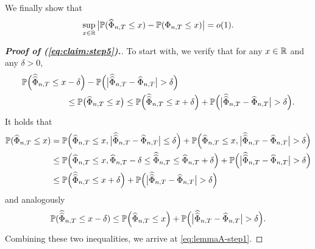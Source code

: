 We finally show that 
\begin{equation}\label{eq:claim:step5}
\sup_{x \in \mathbb{R}} \big| \mathbb{P}(\widehat{\Phi}_{n, T} \le x) - \mathbb{P}(\Phi_{n,T} \le x) \big| = o(1).
\end{equation}
\begin{proof}[\textnormal{\textbf{Proof of (\ref{eq:claim:step5}).}}]
To start with, we verify that for any $x \in \mathbb{R}$ and any $\delta > 0$, 
\begin{align}
\mathbb{P}\Big( \widehat{\widehat{\Phi}}_{n,T} \le x & - \delta\Big) - \mathbb{P} \Big(\big|\widehat{\widehat{\Phi}}_{n,T} - \widehat{\Phi}_{n,T}\big| > \delta \Big) \nonumber \\
 & \le \mathbb{P}\big(\widehat{\Phi}_{n, T} \le x\big) \le\mathbb{P}\Big(\widehat{\widehat{\Phi}}_{n,T} \le x + \delta\Big) + \mathbb{P} \Big(\big|\widehat{\widehat{\Phi}}_{n,T} - \widehat{\Phi}_{n,T}\big| > \delta \Big). \label{eq:lemmaA-step1}
\end{align}
It holds that
\begin{align*} 
\mathbb{P}(\widehat{\Phi}_{n, T} \le x) &= \mathbb{P} \Big(\widehat{\Phi}_{n, T} \le x, \big|\widehat{\widehat{\Phi}}_{n,T} - \widehat{\Phi}_{n,T}\big| \le \delta \Big) + \mathbb{P} \Big(\widehat{\Phi}_{n, T} \le x, \big|\widehat{\widehat{\Phi}}_{n,T} - \widehat{\Phi}_{n,T}\big| > \delta \Big) \\
& \le  \mathbb{P} \Big(\widehat{\Phi}_{n, T} \le x, \widehat{\Phi}_{n,T} - \delta \le \widehat{\widehat{\Phi}}_{n,T} \le \widehat{\Phi}_{n,T} + \delta \Big) + \mathbb{P} \Big(\big|\widehat{\widehat{\Phi}}_{n,T} - \widehat{\Phi}_{n,T}\big| > \delta \Big) \\
& \le  \mathbb{P} \Big(\widehat{\widehat{\Phi}}_{n,T} \le x + \delta \Big) + \mathbb{P} \Big(\big|\widehat{\widehat{\Phi}}_{n,T} - \widehat{\Phi}_{n,T}\big| > \delta \Big)
\end{align*}
and analogously 
\begin{align*} \mathbb{P}(\widehat{\widehat{\Phi}}_{n, T} \le x - \delta)  \le  \mathbb{P} \Big(\widehat{\Phi}_{n,T} \le x \Big) + \mathbb{P} \Big(\big|\widehat{\widehat{\Phi}}_{n,T} - \widehat{\Phi}_{n,T}\big| > \delta \Big).
\end{align*}
Combining these two inequalities, we arrive at \eqref{eq:lemmaA-step1}.



\end{proof}
